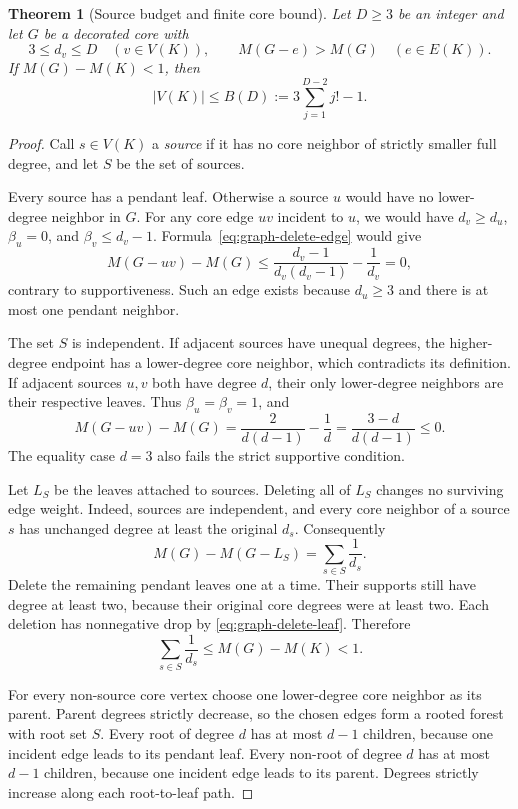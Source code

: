 \documentclass[11pt,a4paper]{article}
\newtheorem{theorem}{Theorem}[section]
\theoremstyle{definition}\newtheorem{definition}[theorem]{Definition}
\theoremstyle{remark}\newtheorem{remark}[theorem]{Remark}
\begin{document}
\begin{theorem}[Source budget and finite core bound]
\label{thm:graph-source-budget}
Let $D\ge3$ be an integer and let $G$ be a decorated core with
\[
 3\le d_v\le D\quad(v\in V(K)),
 \qquad M(G-e)>M(G)\quad(e\in E(K)).
\]
If $M(G)-M(K)<1$, then
\begin{equation}\label{eq:graph-factorial-bound}
 |V(K)|\le B(D):=3\sum_{j=1}^{D-2}j!-1.
\end{equation}
\end{theorem}
\begin{proof}
Call $s\in V(K)$ a \emph{source} if it has no core neighbor of strictly
smaller full degree, and let $S$ be the set of sources.

Every source has a pendant leaf. Otherwise a source $u$ would have no
lower-degree neighbor in $G$. For any core edge $uv$ incident to $u$,
we would have $d_v\ge d_u$, $\beta_u=0$, and $\beta_v\le d_v-1$.
Formula~\eqref{eq:graph-delete-edge} would give
\[
 M(G-uv)-M(G)
 \le\frac{d_v-1}{d_v(d_v-1)}-\frac1{d_v}=0,
\]
contrary to supportiveness. Such an edge exists because $d_u\ge3$
and there is at most one pendant neighbor.

The set $S$ is independent. If adjacent sources have unequal degrees,
the higher-degree endpoint has a lower-degree core neighbor, which
contradicts its definition. If adjacent sources $u,v$ both have degree
$d$, their only lower-degree neighbors are their respective leaves.
Thus $\beta_u=\beta_v=1$, and
\[
 M(G-uv)-M(G)=\frac2{d(d-1)}-\frac1d
             =\frac{3-d}{d(d-1)}\le0.
\]
The equality case $d=3$ also fails the strict supportive condition.

Let $L_S$ be the leaves attached to sources. Deleting all of $L_S$
changes no surviving edge weight. Indeed, sources are independent,
and every core neighbor of a source $s$ has unchanged degree at least
the original $d_s$. Consequently
\begin{equation}\label{eq:graph-source-identity}
 M(G)-M(G-L_S)=\sum_{s\in S}\frac1{d_s}.
\end{equation}
Delete the remaining pendant leaves one at a time. Their supports still
have degree at least two, because their original core degrees were at
least two. Each deletion has nonnegative drop by
\eqref{eq:graph-delete-leaf}. Therefore
\begin{equation}\label{eq:graph-source-budget}
 \sum_{s\in S}\frac1{d_s}
 \le M(G)-M(K)<1.
\end{equation}

For every non-source core vertex choose one lower-degree core neighbor
as its parent. Parent degrees strictly decrease, so the chosen edges
form a rooted forest with root set $S$. Every root of degree $d$ has at
most $d-1$ children, because one incident edge leads to its pendant
leaf. Every non-root of degree $d$ has at most $d-1$ children, because
one incident edge leads to its parent. Degrees strictly increase along
each root-to-leaf path.


\end{proof}
\end{document}

